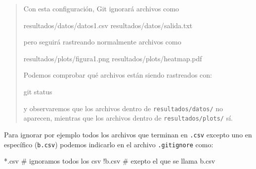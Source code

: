 \documentclass[
  spanish,
  12pt,
  letterpaper,
  DIV=11,
  numbers=noendperiod]{scrreprt}
\newenvironment{Shaded}{\begin{snugshade}}{\end{snugshade}}
\newcommand{\CommentTok}[1]{\textcolor[rgb]{0.37,0.37,0.37}{#1}}
\newcommand{\ExtensionTok}[1]{\textcolor[rgb]{0.00,0.23,0.31}{#1}}
\newcommand{\FunctionTok}[1]{\textcolor[rgb]{0.28,0.35,0.67}{#1}}
\newcommand{\NormalTok}[1]{\textcolor[rgb]{0.00,0.23,0.31}{#1}}
\begin{document}
\begin{tcolorbox}
\begin{quote}
Con esta configuración, Git ignorará archivos como

\begin{Shaded}
\begin{Highlighting}[]
\NormalTok{resultados/datos/datos1.csv}
\NormalTok{resultados/datos/salida.txt}
\end{Highlighting}
\end{Shaded}

pero seguirá rastreando normalmente archivos como

\begin{Shaded}
\begin{Highlighting}[]
\NormalTok{resultados/plots/figura1.png}
\NormalTok{resultados/plots/heatmap.pdf}
\end{Highlighting}
\end{Shaded}

Podemos comprobar qué archivos están siendo rastreados con:

\begin{Shaded}
\begin{Highlighting}[]
\FunctionTok{git}\NormalTok{ status}
\end{Highlighting}
\end{Shaded}

y observaremos que los archivos dentro de \texttt{resultados/datos/} no
aparecen, mientras que los archivos dentro de \texttt{resultados/plots/}
sí.
\end{quote}

\end{tcolorbox}

Para ignorar por ejemplo todos los archivos que terminan en
\texttt{.csv} excepto uno en específico (\texttt{b.csv}) podemos
indicarlo en el archivo \texttt{.gitignore} como:

\begin{Shaded}
\begin{Highlighting}[]
\ExtensionTok{*.csv}  \CommentTok{\# ignoramos todos los csv}
\ExtensionTok{!b.csv} \CommentTok{\# exepto el que se llama b.csv}
\end{Highlighting}
\end{Shaded}
\end{document}
